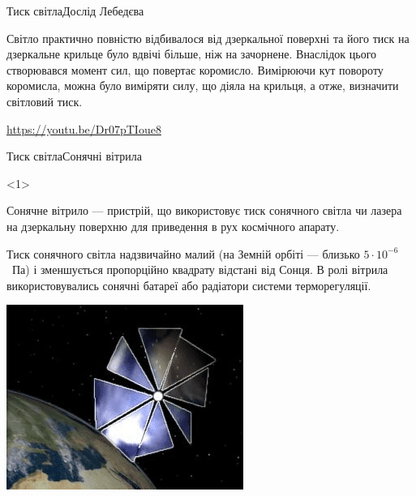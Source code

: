 \documentclass[onlytextwidth]{beamer}
\begin{document}
\begin{frame}{Тиск світла}{Дослід Лебедєва}
	\begin{block}{}\justifying
		Світло практично повністю відбивалося від дзеркальної поверхні та його тиск на дзеркальне крильце було вдвічі більше, ніж на зачорнене. Внаслідок цього створювався момент сил, що повертає коромисло. Вимірюючи кут повороту коромисла, можна було виміряти силу, що діяла на крильця, а отже, визначити світловий тиск.
	\end{block}
	{\tiny \url{https://youtu.be/Dr07pTIoue8}}
\end{frame}

\begin{frame}{Тиск світла}{Сонячні вітрила}\small
	\begin{onlyenv}
		\begin{block}{}\justifying
			Сонячне вітрило --- пристрій, що використовує тиск сонячного світла чи лазера на дзеркальну поверхню для приведення в рух космічного апарату.

			\bigskip

			Тиск сонячного світла надзвичайно малий (на Земній орбіті --- близько $5\cdot10^{-6}$~Па) і зменшується пропорційно квадрату відстані від Сонця. В ролі вітрила використовувались сонячні батареї або радіатори системи терморегуляції.
		\end{block}

		\begin{center}
			\includegraphics[width=0.4\linewidth]{Cosmos_solar_sail}
		\end{center}


\end{onlyenv}
\end{frame}
\end{document}
